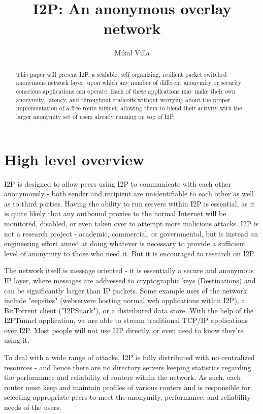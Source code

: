 \documentclass[a4paper,twocolumn,12pt]{article}
\title{I2P: An anonymous overlay network}
\author{Mikal Villa}
\begin{document}
\maketitle

\begin{abstract}\noindent
This paper will present I2P, a scalable, self organizing, resilient packet switched anonymous network layer, upon which any number of different anonymity or security conscious applications can operate. Each of these applications may make their own anonymity, latency, and throughput tradeoffs without worrying about the proper implementation of a free route mixnet, allowing them to blend their activity with the larger anonymity set of users already running on top of I2P.
\end{abstract}

\tableofcontents

\section{High level overview}

I2P is designed to allow peers using I2P to communicate with each other anonymously - both sender and recipient are unidentifiable to each other as well as to third parties. Having the ability to run servers within I2P is essential, as it is quite likely that any outbound proxies to the normal Internet will be monitored, disabled, or even taken over to attempt more malicious attacks. I2P is not a research project - academic, commercial, or governmental, but is instead an engineering effort aimed at doing whatever is necessary to provide a sufficient level of anonymity to those who need it. But it is encouraged to research on I2P.

The network itself is message oriented - it is essentially a secure and anonymous IP layer, where messages are addressed to cryptographic keys (Destinations) and can be significantly larger than IP packets. Some example uses of the network include "eepsites" (webservers hosting normal web applications within I2P), a BitTorrent client ("I2PSnark"), or a distributed data store. With the help of the I2PTunnel application, we are able to stream traditional TCP/IP applications over I2P. Most people will not use I2P directly, or even need to know they're using it.

To deal with a wide range of attacks, I2P is fully distributed with no centralized resources - and hence there are no directory servers keeping statistics regarding the performance and reliability of routers within the network. As such, each router must keep and maintain profiles of various routers and is responsible for selecting appropriate peers to meet the anonymity, performance, and reliability needs of the users.
\end{document}
